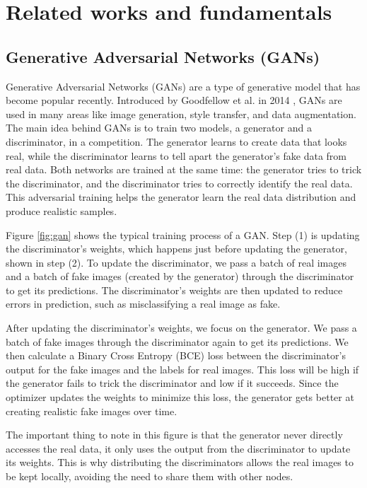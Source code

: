 \chapter{Related works and fundamentals}

\section{Generative Adversarial Networks (GANs)}
Generative Adversarial Networks (GANs) are a type of generative model that has become popular recently. Introduced by Goodfellow et al. in 2014 \cite{goodfellow2014generative}, GANs are used in many areas like image generation, style transfer, and data augmentation. The main idea behind GANs is to train two models, a generator and a discriminator, in a competition. The generator learns to create data that looks real, while the discriminator learns to tell apart the generator's fake data from real data. Both networks are trained at the same time: the generator tries to trick the discriminator, and the discriminator tries to correctly identify the real data. This adversarial training helps the generator learn the real data distribution and produce realistic samples.


Figure \ref{fig:gan} shows the typical training process of a GAN. Step (1) is updating the discriminator's weights, which happens just before updating the generator, shown in step (2). To update the discriminator, we pass a batch of real images and a batch of fake images (created by the generator) through the discriminator to get its predictions. The discriminator's weights are then updated to reduce errors in prediction, such as misclassifying a real image as fake.


After updating the discriminator's weights, we focus on the generator. We pass a batch of fake images through the discriminator again to get its predictions. We then calculate a Binary Cross Entropy (BCE) loss between the discriminator's output for the fake images and the labels for real images. This loss will be high if the generator fails to trick the discriminator and low if it succeeds. Since the optimizer updates the weights to minimize this loss, the generator gets better at creating realistic fake images over time.


The important thing to note in this figure is that the generator never directly accesses the real data, it only uses the output from the discriminator to update its weights. This is why distributing the discriminators allows the real images to be kept locally, avoiding the need to share them with other nodes.

